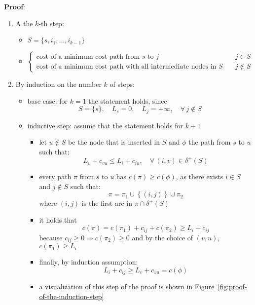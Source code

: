 \documentclass[english]{article}
\begin{document}
\textbf{Proof}:
\begin{enumerate}
  \item A the \(k\)-th step:
        \begin{itemize}
          \item \(S = \{s, i_1, \ldots, i_{k-1}\}\)
          \item \(\begin{cases}\text{cost of a minimum cost path from } s \text{ to } j & j \in S \\ \text{cost of a minimum cost path with all intermediate nodes in } S \quad & j \notin S\end{cases}\)
        \end{itemize}
  \item By induction on the number \(k\) of steps:
        \begin{itemize}
          \item base case: for \(k = 1\) the statement holds, since
                \[S = \{s\}, \quad L_s = 0, \quad L_j = +\infty, \quad \forall \, j \notin S \]
          \item inductive step: assume that the statement holds for \(k+1\)
                \begin{itemize}
                  \item let \(u \notin S\) be the node that is inserted in \(S\) and \(\phi\) the path from \(s\) to \(u\) such that:
                        \[ L_v + c_{vu} \leq L_i + c_{iu}, \quad \forall \, (i, v) \in \delta^+(S) \]
                  \item every path \(\pi\) from \(s\) to \(u\) has \(c(\pi) \geq c(\phi)\), as there exists \(i \in S\) and \(j \notin S\) such that:
                        \[ \pi = \pi_1 \cup \left\{ \left( i, j \right)  \right\} \cup \pi_2 \]
                        where \((i, j)\) is the first arc in \(\pi \cap \delta^+(S)\)
                  \item it holds that
                        \[ c(\pi) = c(\pi_1) + c_{ij} + c(\pi_2) \geq L_i + c_{ij} \]
                        because \(c_{ij} \geq 0 \Rightarrow c(\pi_2) \geq 0\) and by the choice of \((v, u)\), \(c(\pi_1) \geq L_i\)
                  \item finally, by induction assumption:
                        \[ L_i + c_{ij} \geq L_v + c_{vu} = c(\phi) \]
                  \item a visualization of this step of the proof is shown in Figure~\ref{fig:proof-of-the-induction-step}
                \end{itemize}
        \end{itemize}
\end{enumerate}
\end{document}
